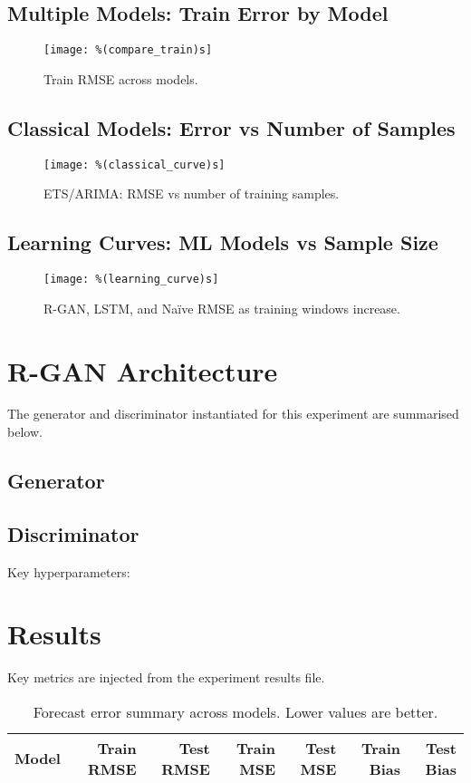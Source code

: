 \documentclass[11pt]{article}
\begin{document}
\subsection{Multiple Models: Train Error by Model}
\begin{figure}[h]
\centering
\texttt{[image: \%(compare\_train)s]}
\caption{Train RMSE across models.}
\end{figure}

\subsection{Classical Models: Error vs Number of Samples}
\begin{figure}[h]
\centering
\texttt{[image: \%(classical\_curve)s]}
\caption{ETS/ARIMA: RMSE vs number of training samples.}
\end{figure}

\subsection{Learning Curves: ML Models vs Sample Size}
\begin{figure}[h]
\centering
\texttt{[image: \%(learning\_curve)s]}
\caption{R-GAN, LSTM, and Naïve RMSE as training windows increase.}
\end{figure}

\section{R-GAN Architecture}
The generator and discriminator instantiated for this experiment are summarised below.

\subsection{Generator}
\begin{itemize}
\end{itemize}

\subsection{Discriminator}
\begin{itemize}
\end{itemize}

Key hyperparameters: %

\section{Results}
Key metrics are injected from the experiment results file.

\begin{table}[h]
\centering
\begin{tabular}{lrrrrrr}
\toprule
Model & Train RMSE & Test RMSE & Train MSE & Test MSE & Train Bias & Test Bias \\
\midrule
\bottomrule
\end{tabular}
\caption{Forecast error summary across models. Lower values are better.}
\end{table}
\end{document}
